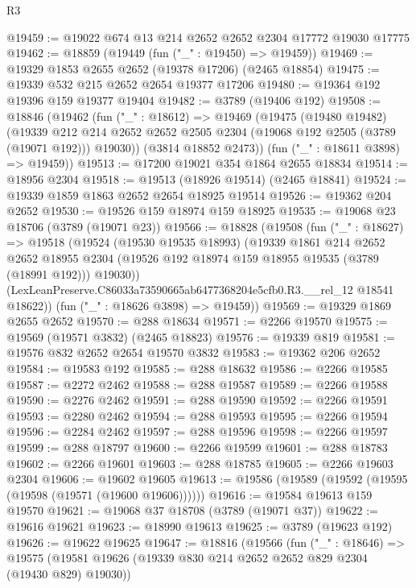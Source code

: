 \begin{lexlean}{R3}
\begin{coremodule}
@19459 := @19022 @674 @13 @214 @2652 @2652 @2304 @17772 @19030 @17775
@19462 := @18859 (@19449 (fun ("_" : @19450) => @19459))
@19469 := @19329 @1853 @2655 @2652 (@19378 @17206) (@2465 @18854)
@19475 := @19339 @532 @215 @2652 @2654 @19377 @17206
@19480 := @19364 @192 @19396 @159 @19377 @19404
@19482 := @3789 (@19406 @192)
@19508 := @18846
    (@19462
      (fun ("_" : @18612) =>
      @19469
        (@19475
          (@19480 @19482)
          (@19339
            @212
            @214
            @2652
            @2652
            @2505
            @2304
            (@19068 @192 @2505 (@3789 (@19071 @192)))
            @19030))
        (@3814 @18852 @2473))
      (fun ("_" : @18611 @3898) => @19459))
@19513 := @17200 @19021 @354 @1864 @2655 @18834
@19514 := @18956 @2304
@19518 := @19513 (@18926 @19514) (@2465 @18841)
@19524 := @19339 @1859 @1863 @2652 @2654 @18925 @19514
@19526 := @19362 @204 @2652
@19530 := @19526 @159 @18974 @159 @18925
@19535 := @19068 @23 @18706 (@3789 (@19071 @23))
@19566 := @18828
    (@19508
      (fun ("_" : @18627) =>
      @19518
        (@19524
          (@19530 @19535 @18993)
          (@19339
            @1861
            @214
            @2652
            @2652
            @18955
            @2304
            (@19526 @192 @18974 @159 @18955 @19535 (@3789 (@18991 @192)))
            @19030))
        (LexLeanPreserve.C86033a73590665ab6477368204e5cfb0.R3.__rel_12 @18541 @18622))
      (fun ("_" : @18626 @3898) => @19459))
@19569 := @19329 @1869 @2655 @2652
@19570 := @288 @18634
@19571 := @2266 @19570
@19575 := @19569 (@19571 @3832) (@2465 @18823)
@19576 := @19339 @819
@19581 := @19576 @832 @2652 @2654 @19570 @3832
@19583 := @19362 @206 @2652
@19584 := @19583 @192
@19585 := @288 @18632
@19586 := @2266 @19585
@19587 := @2272 @2462
@19588 := @288 @19587
@19589 := @2266 @19588
@19590 := @2276 @2462
@19591 := @288 @19590
@19592 := @2266 @19591
@19593 := @2280 @2462
@19594 := @288 @19593
@19595 := @2266 @19594
@19596 := @2284 @2462
@19597 := @288 @19596
@19598 := @2266 @19597
@19599 := @288 @18797
@19600 := @2266 @19599
@19601 := @288 @18783
@19602 := @2266 @19601
@19603 := @288 @18785
@19605 := @2266 @19603 @2304
@19606 := @19602 @19605
@19613 := @19586 (@19589 (@19592 (@19595 (@19598 (@19571 (@19600 @19606))))))
@19616 := @19584 @19613 @159 @19570
@19621 := @19068 @37 @18708 (@3789 (@19071 @37))
@19622 := @19616 @19621
@19623 := @18990 @19613
@19625 := @3789 (@19623 @192)
@19626 := @19622 @19625
@19647 := @18816
    (@19566
      (fun ("_" : @18646) =>
      @19575
        (@19581 @19626 (@19339 @830 @214 @2652 @2652 @829 @2304 (@19430 @829) @19030))

\end{coremodule}
\end{lexlean}
